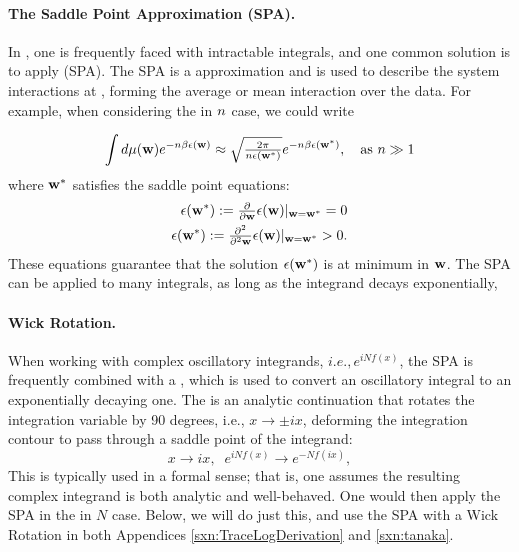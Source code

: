 \paragraph{The Saddle Point Approximation (SPA).}In \STATMECH, one is frequently faced with intractable integrals, and one common solution is to apply \SaddlePointApproximation (SPA). The SPA is a \LargeN approximation and is used to describe the system interactions at \LargeN, forming the average or mean interaction over the data.
For example, when considering the \LargeN in $n$ case, we could write

\begin{align}
  \label{eqn:SPA}
  \int d\mu({\mathbf{w}}) e^{-n\beta\epsilon({\mathbf{w}})}\approx \sqrt{\tfrac{2\pi}{n\epsilon({\mathbf{w}}^{*})}} e^{-n\beta\epsilon({\mathbf{w}}^{*})}  
  , \quad \text{as } n \gg 1
\end{align}
where ${\mathbf{w}}^{*}$ satisfies the saddle point equations:
\begin{align}
  \epsilon({\mathbf{w}}^{*}):=\tfrac{\partial}{\partial {\mathbf{w}}}\epsilon({\mathbf{w}})\vert_{{\mathbf{w}}={\mathbf{w}}^{*}}=0 \\
  \epsilon({\mathbf{w}}^{*}):=\tfrac{\partial^{2}}{\partial^{2} {\mathbf{w}}}\epsilon({\mathbf{w}})\vert_{{\mathbf{w}}={\mathbf{w}}^{*}}>0  .
\end{align}
These equations guarantee that the solution $\epsilon({\mathbf{w}}^{*})$ is at  minimum in ${\mathbf{w}}$.
The SPA can be applied to many \LargeN integrals, as long as the integrand decays exponentially,  

\paragraph{Wick Rotation.} When working with complex oscillatory integrands, $i.e., e^{iNf(x)}$,   
the SPA is frequently combined with a \emph{\WickRotation}, 
which is used to convert an oscillatory integral to an exponentially decaying one.
The \WickRotation is an analytic continuation that rotates the integration variable by 90 degrees, i.e., $x \to \pm i x$, deforming the integration contour to pass through a saddle point of the integrand:
\begin{equation}
x\rightarrow ix,\;\;e^{iNf(x)}\rightarrow e^{-Nf(ix)},
\end{equation}
This is typically used in a formal sense; that is, one assumes the resulting complex integrand is both analytic and well-behaved.
One would then apply the SPA in the \LargeN in $N$ case.
Below, we will do just this, and  use the SPA with a Wick Rotation in both Appendices \ref{sxn:TraceLogDerivation} and \ref{sxn:tanaka}.

